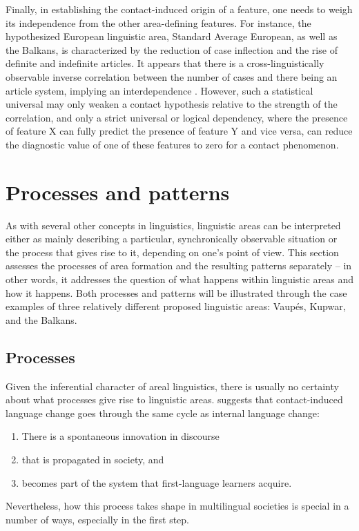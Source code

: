 \documentclass[output=paper]{langscibook}
\begin{document}
Finally, in establishing the contact-induced origin of a feature, one needs to weigh its independence from the other area-defining features. For instance, the hypothesized European linguistic area, Standard Average European, as well as the Balkans, is characterized by the reduction of case inflection and the rise of definite and indefinite articles. It appears that there is a cross-linguistically observable inverse correlation between the number of cases and there being an article system, implying an interdependence \parencite{sinnemäki2018}. However, such a statistical universal may only weaken a contact hypothesis relative to the strength of the correlation, and only a strict universal or logical dependency, where the presence of feature X can fully predict the presence of feature Y and vice versa, can reduce the diagnostic value of one of these features to zero for a contact phenomenon.

\section{Processes and patterns} \label{sec-patterns-processes}

As with several other concepts in linguistics, linguistic areas can be interpreted either as mainly describing a particular, synchronically observable situation or the process that gives rise to it, depending on one's point of view. This section assesses the processes of area formation and the resulting patterns separately -- in other words, it addresses the question of what happens within linguistic areas and how it happens. Both processes and patterns will be illustrated through the case examples of three relatively different proposed linguistic areas: Vaupés, Kupwar, and the Balkans.

\subsection{Processes} \label{sec:processes}

Given the inferential character of areal linguistics, there is usually no certainty about what processes give rise to linguistic areas. \textcite{Matras2011Explaining} suggests that contact-induced language change goes through the same cycle as internal language change:

\begin{enumerate}
\setlength{\itemsep}{0.0\baselineskip}
\item There is a spontaneous innovation in discourse
\item that is propagated in society, and
\item becomes part of the system that first-language learners acquire.

\end{enumerate}
Nevertheless, how this process takes shape in multilingual societies is special in a number of ways, especially in the first step.
\end{document}
